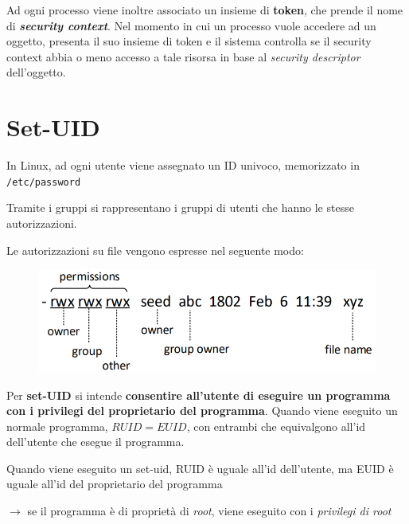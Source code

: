 \noindent Ad ogni processo viene inoltre associato un insieme di \textbf{token}, che prende il nome di 
\textbf{\textit{security context}}. Nel momento in cui un processo vuole accedere ad un oggetto, presenta 
il suo insieme di token e il sistema controlla se il security context abbia o meno accesso a tale risorsa 
in base al \textit{security descriptor} dell'oggetto.

\newpage
\section{Set-UID}
In Linux, ad ogni utente viene assegnato un ID univoco, memorizzato in \\ \texttt{/etc/password}

\noindent Tramite i gruppi si rappresentano i gruppi di utenti che hanno le stesse autorizzazioni.

\noindent Le autorizzazioni su file vengono espresse nel seguente modo:
\begin{figure}[H]
    \centering
    \includegraphics[width=0.8\linewidth]{chapters/3/images/linux-accesso-file.png}
\end{figure}

\noindent Per \textbf{set-UID} si intende \textbf{consentire all'utente di eseguire un programma 
con i privilegi del proprietario del programma}. Quando viene eseguito un normale programma, 
$RUID = EUID$, con entrambi che equivalgono all'id dell'utente che esegue il programma.

\noindent Quando viene eseguito un set-uid, RUID è uguale all'id dell'utente, ma EUID è 
uguale all'id del proprietario del programma

$\rightarrow$ se il programma è di proprietà di \textit{root}, viene eseguito con i 
\textit{privilegi di root}


